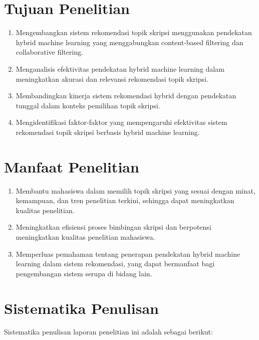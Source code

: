 \section{Tujuan Penelitian}
    \begin{enumerate}
        \item Mengembangkan sistem rekomendasi topik skripsi menggunakan pendekatan hybrid machine learning yang menggabungkan content-based filtering dan collaborative filtering.
        \item Menganalisis efektivitas pendekatan hybrid machine learning dalam meningkatkan akurasi dan relevansi rekomendasi topik skripsi.
        \item Membandingkan kinerja sistem rekomendasi hybrid dengan pendekatan tunggal dalam konteks pemilihan topik skripsi.
        \item Mengidentifikasi faktor-faktor yang mempengaruhi efektivitas sistem rekomendasi topik skripsi berbasis hybrid machine learning.
    \end{enumerate}

\section{Manfaat Penelitian}
    \begin{enumerate}
        \item Membantu mahasiswa dalam memilih topik skripsi yang sesuai dengan minat, kemampuan, dan tren penelitian terkini, sehingga dapat meningkatkan kualitas penelitian.
        \item Meningkatkan efisiensi proses bimbingan skripsi dan berpotensi meningkatkan kualitas penelitian mahasiswa.
        \item Memperluas pemahaman tentang penerapan pendekatan hybrid machine learning dalam sistem rekomendasi, yang dapat bermanfaat bagi pengembangan sistem serupa di bidang lain.
    \end{enumerate}

\section{Sistematika Penulisan}
Sistematika penulisan laporan penelitian ini adalah sebagai berikut:

